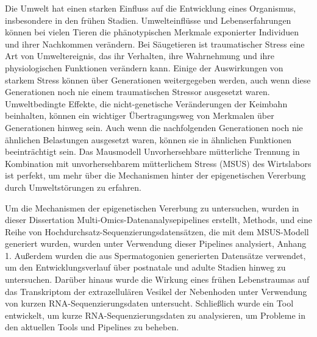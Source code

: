 \documentclass[12pt,twoside]{reedthesis}
\begin{document}
Die Umwelt hat einen starken Einfluss auf die Entwicklung eines Organismus, insbesondere in den frühen Stadien. Umwelteinflüsse und Lebenserfahrungen können bei vielen Tieren die phänotypischen Merkmale exponierter Individuen und ihrer Nachkommen verändern. Bei Säugetieren ist traumatischer Stress eine Art von Umweltereignis, das ihr Verhalten, ihre Wahrnehmung und ihre physiologischen Funktionen verändern kann. Einige der Auswirkungen von starkem Stress können über Generationen weitergegeben werden, auch wenn diese Generationen noch nie einem traumatischen Stressor ausgesetzt waren. Umweltbedingte Effekte, die nicht-genetische Veränderungen der Keimbahn beinhalten, können ein wichtiger Übertragungsweg von Merkmalen über Generationen hinweg sein. Auch wenn die nachfolgenden Generationen noch nie ähnlichen Belastungen ausgesetzt waren, können sie in ähnlichen Funktionen beeinträchtigt sein. Das Mausmodell Unvorhersehbare mütterliche Trennung in Kombination mit unvorhersehbarem mütterlichem Stress (MSUS) des Wirtslabors ist perfekt, um mehr über die Mechanismen hinter der epigenetischen Vererbung durch Umweltstörungen zu erfahren.

Um die Mechanismen der epigenetischen Vererbung zu untersuchen, wurden in dieser Dissertation Multi-Omics-Datenanalysepipelines erstellt, Methods, und eine Reihe von Hochdurchsatz-Sequenzierungsdatensätzen, die mit dem MSUS-Modell generiert wurden, wurden unter Verwendung dieser Pipelines analysiert, Anhang 1. Außerdem wurden die aus Spermatogonien generierten Datensätze verwendet, um den Entwicklungsverlauf über postnatale und adulte Stadien hinweg zu untersuchen. Darüber hinaus wurde die Wirkung eines frühen Lebenstraumas auf das Transkriptom der extrazellulären Vesikel der Nebenhoden unter Verwendung von kurzen RNA-Sequenzierungsdaten untersucht. Schließlich wurde ein Tool entwickelt, um kurze RNA-Sequenzierungsdaten zu analysieren, um Probleme in den aktuellen Tools und Pipelines zu beheben.
\end{document}
